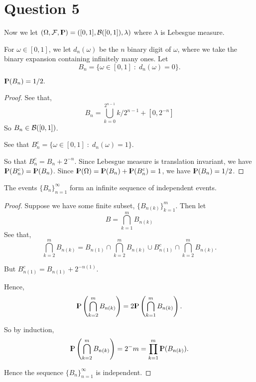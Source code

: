 \documentclass{unswmaths}
\begin{document}
\section*{Question 5}
Now we let $(\Omega,\mathcal{F},{\rm I\kern-.3em P}) = ([0,1],\mathcal{B}([0,1]),\lambda)$
where $\lambda$ is Lebesgue measure.

For $\omega \in [0,1]$, we let $d_n(\omega)$ be the $n$ binary digit
of $\omega$, where we take the binary expansion containing infinitely many ones.
Let 
\begin{equation*}
    B_n = \{\omega \in [0,1]\;:\;d_n(\omega) = 0\}.
\end{equation*}

\begin{lemma}
    ${\rm I\kern-.3em P}(B_n) = 1/2.$
\end{lemma}
\begin{proof}
    See that,
    \begin{equation*}
        B_n = \bigcup_{k=0}^{2^{n-1}}k/2^{n-1}+[0,2^{-n}]
    \end{equation*}
    So $B_n \in \mathcal{B}([0,1])$.


    See that $B_n^c = \{\omega \in [0,1]\;:\;d_n(\omega) = 1\}$.
    
    So that $B_n^c = B_n+2^{-n}$. Since Lebesgue measure
    is translation invariant, we have ${\rm I\kern-.3em P}(B_n^c) = {\rm I\kern-.3em P}(B_n)$.
    Since ${\rm I\kern-.3em P}(\Omega) = {\rm I\kern-.3em P}(B_n)+{\rm I\kern-.3em P}(B_n^c) = 1$,
    we have ${\rm I\kern-.3em P}(B_n) = 1/2$.
\end{proof}

\begin{lemma}
    The events $\{B_n\}_{n=1}^\infty$ form an infinite sequence of independent
    events.
\end{lemma}
\begin{proof}
    Suppose we have some finite subset, $\{B_{n(k)}\}_{k=1}^m$. Then let
    \begin{equation*}
        B = \bigcap_{k=1}^m B_{n(k)}
    \end{equation*}
    See that,
    \begin{equation*}
        \bigcap_{k=2}^m B_{n(k)} = B_{n(1)}\cap\bigcap_{k=2}^m B_{n(k)}\cup B_{n(1)}^c\cap\bigcap_{k=2}^m B_{n(k)}.
    \end{equation*}
    
    But $B_{n(1)}^c = B_{n(1)}+2^{-n(1)}$.
    
    Hence, 
    \begin{equation*}
        {\rm I\kern-.3em P}\left(\bigcap_{k=2}^m B_{n(k)}\right) = 2{\rm I\kern-.3em P}\left(\bigcap_{k=1}^m B_{n(k)}\right).
    \end{equation*}
    
    So by induction,
    \begin{equation*}
        {\rm I\kern-.3em P}\left(\bigcap_{k=2}^m B_{n(k)} \right) = 2^-m = \prod_{k=1}^m {\rm I\kern-.3em P}(B_{n(k)}).
    \end{equation*}
    
    Hence the sequence $\{B_n\}_{n=1}^\infty$ is independent.
\end{proof}
\end{document}
